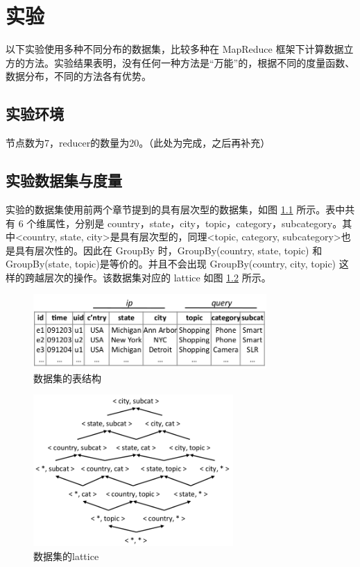 \chapter{实验}

以下实验使用多种不同分布的数据集，比较多种在 MapReduce 框架下计算数据立方的方法。实验结果表明，没有任何一种方法是``万能”的，根据不同的度量函数、数据分布，不同的方法各有优势。

\section{实验环境}

节点数为7，reducer的数量为20。（此处为完成，之后再补充）

\section{实验数据集与度量}

实验的数据集使用前两个章节提到的具有层次型的数据集，如图 \ref{dataset_table} 所示。表中共有 6 个维属性，分别是 country，state，city，topic，category，subcategory。其中\textless country, state, city\textgreater 是具有层次型的，同理\textless topic, category, subcategory\textgreater 也是具有层次性的。因此在 GroupBy 时，GroupBy(country, state, topic) 和 GroupBy(state, topic)是等价的。并且不会出现 GroupBy(country, city, topic) 这样的跨越层次的操作。该数据集对应的 lattice 如图 \ref{dataset_lattice} 所示。

\begin{figure}[!htb]
\centering\includegraphics[width=3.5in]{picture/ch_datacube_mr/dataset_table} 
\caption{数据集的表结构}\label{dataset_table} 
\end{figure} 

\begin{figure}[!htb]
\centering\includegraphics[width=3in]{picture/ch_datacube_mr/dataset_lattice} 
\caption{数据集的lattice}\label{dataset_lattice} 
\end{figure} 

